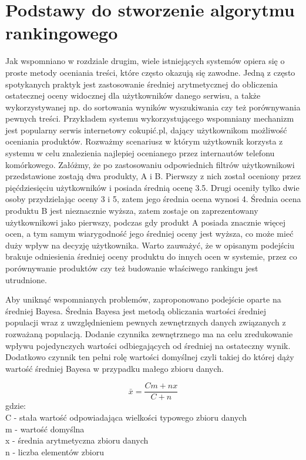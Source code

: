 \section{Podstawy do stworzenie algorytmu rankingowego}

Jak wspomniano w rozdziale drugim, wiele istniejących systemów opiera się o proste metody oceniania treści, które często okazują się zawodne. Jedną z często spotykanych praktyk jest zastosowanie średniej arytmetycznej do obliczenia ostatecznej oceny widocznej dla użytkowników danego serwisu, a także wykorzystywanej np. do sortowania wyników wyszukiwania czy też porównywania pewnych treści. Przykładem systemu wykorzystującego wspomniany mechanizm jest popularny serwis internetowy cokupić.pl, dający użytkownikom możliwość oceniania produktów. Rozważmy scenariusz w którym użytkownik korzysta z systemu w celu znalezienia najlepiej ocenianego przez internautów telefonu komórkowego. Załóżmy, że po zastosowaniu odpowiednich filtrów użytkownikowi przedstawione zostają dwa produkty, A i B. Pierwszy z nich został oceniony przez pięćdziesięciu użytkowników i posiada średnią ocenę 3.5. Drugi oceniły tylko dwie osoby przydzielając oceny 3 i 5, zatem jego średnia ocena wynosi 4. Średnia ocena produktu B jest nieznacznie wyższa, zatem zostaje on zaprezentowany użytkownikowi jako pierwszy, podczas gdy produkt A posiada znacznie więcej ocen, a tym samym wiarygodność jego średniej oceny jest wyższa, co może mieć duży wpływ na decyzję użytkownika. Warto zauważyć, że w opisanym podejściu brakuje odniesienia średniej oceny produktu do innych ocen w systemie, przez co porównywanie produktów czy też budowanie właściwego rankingu jest utrudnione.

Aby uniknąć wspomnianych problemów, zaproponowano podejście oparte na średniej Bayesa. Średnia Bayesa jest metodą obliczania wartości średniej populacji wraz z uwzględnieniem pewnych zewnętrznych danych związanych z rozważaną populacją. Dodanie czynnika zewnętrznego ma na celu zredukowanie wpływu pojedynczych wartości odbiegających od średniej na ostateczny wynik. Dodatkowo czynnik ten pełni rolę wartości domyślnej czyli takiej do której dąży wartość średniej Bayesa w przypadku małego zbioru danych.\cite{bayesWiki}

\begin{equation}
\bar{x}=\frac{Cm+nx}{C+n}
\end{equation}
gdzie:\\
C - stała wartość odpowiadająca wielkości typowego zbioru danych\\
m - wartość domyślna\\
x - średnia arytmetyczna zbioru danych\\
n - liczba elementów zbioru\\


